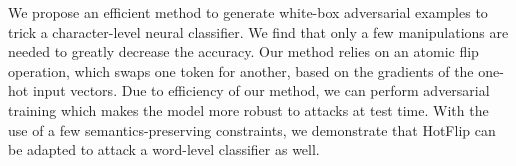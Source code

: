 We propose an efficient method to generate white-box  adversarial examples to trick a character-level neural classifier. We find that only a few manipulations are needed to greatly decrease the accuracy. Our method relies on an atomic flip operation, which swaps one token for another, based on the gradients of the one-hot input vectors. Due to efficiency of our method, we can perform adversarial training which makes the model more robust to attacks at test time. With the use of a few semantics-preserving constraints, we demonstrate that HotFlip can be adapted to attack a word-level classifier as well.
